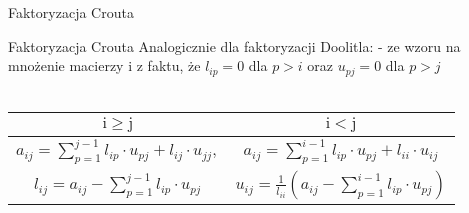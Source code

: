 \begin{frame}{Faktoryzacja Crouta}

\end{frame}
\begin{frame}{Faktoryzacja Crouta}
Analogicznie dla faktoryzacji Doolitla:
- ze wzoru na mnożenie macierzy i z faktu, że $l_{ip}=0$ dla $p>i$ oraz $u_{pj}=0$ dla $p>j$\\
\\

\begin{tabular}{|c|c|}
\hline
 $\mathrm{i}\geq \mathrm{j}$   & $ \mathrm{i}<\mathrm{j}$\\
  \hline
   $a_{ij}=\displaystyle \sum_{p=1}^{j-1}l_{ip}\cdot u_{pj}+l_{ij}\cdot u_{jj},$& $a_{ij}= \displaystyle \sum_{p=1}^{i-1}l_{ip}\cdot u_{pj}+l_{ii}\cdot u_{ij}$\\
 $l_{ij}=a_{ij}-\displaystyle \sum_{p=1}^{j-1}l_{ip}\cdot u_{pj}$ &$u_{ij}=\frac{1}{l_{ii}}(a_{ij}- \displaystyle \sum_{p=1}^{i-1}l_{ip}\cdot u_{pj})$ \\
  \hline
\end{tabular}



\end{frame}

